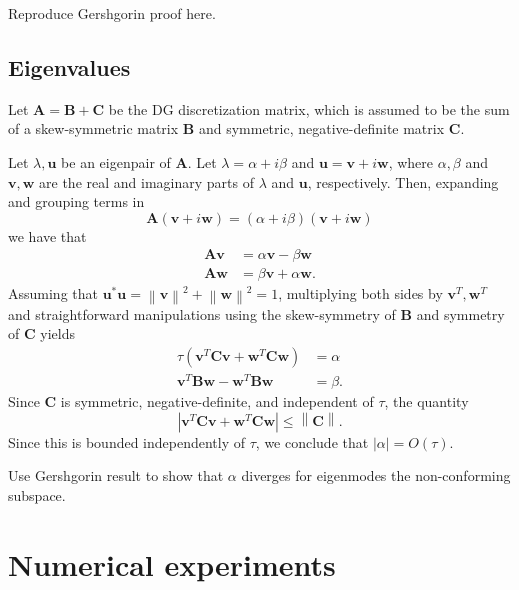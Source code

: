 \documentclass[10pt]{article}
\newcommand{\nor}[1]{\left\| #1 \right\|}
\newcommand{\LRp}[1]{\left( #1 \right)}
\newcommand{\LRb}[1]{\left| #1 \right|}
\newcommand{\note}[1]{{\color{blue}#1}}
\begin{document}
\note{Reproduce Gershgorin proof here.}


\subsection{Eigenvalues}

Let $\bm{A} = \bm{B} + \bm{C}$ be the DG discretization matrix, which is assumed to be the sum of a skew-symmetric matrix $\bm{B}$ and symmetric, negative-definite matrix $\bm{C}$.  

Let $\lambda, \bm{u}$ be an eigenpair of $\bm{A}$. Let $\lambda = \alpha + i\beta$ and $\bm{u} = \bm{v} + i\bm{w}$, where $\alpha,\beta$ and $\bm{v},\bm{w}$ are the real and imaginary parts of $\lambda$ and $\bm{u}$, respectively.  Then, expanding and grouping terms in
\[
\bm{A}(\bm{v} + i\bm{w}) = (\alpha + i\beta) (\bm{v} + i\bm{w})
\]
we have that
\begin{align*}
\bm{A}\bm{v} &= \alpha\bm{v}-\beta\bm{w}\\
\bm{A}\bm{w} &= \beta\bm{v}+\alpha\bm{w}.
\end{align*}
Assuming that $\bm{u}^*\bm{u} = \nor{\bm{v}}^2 + \nor{\bm{w}}^2 = 1$, multiplying both sides by $\bm{v}^T,\bm{w}^T$ and straightforward manipulations %
using the skew-symmetry of $\bm{B}$ and symmetry of $\bm{C}$ yields
\begin{align*}
\tau\LRp{\bm{v}^T\bm{C}\bm{v} + \bm{w}^T\bm{C}\bm{w}} &= \alpha\\
\bm{v}^T\bm{B}\bm{w} - \bm{w}^T\bm{B}\bm{w} &= \beta.
\end{align*}
Since $\bm{C}$ is symmetric, negative-definite, and independent of $\tau$, the quantity
\[
\LRb{\bm{v}^T\bm{C}\bm{v} + \bm{w}^T\bm{C}\bm{w}} \leq \nor{\bm{C}}.
\]
Since this is bounded independently of $\tau$, we conclude that $\LRb{\alpha} = O(\tau)$.  

\note{Use Gershgorin result to show that $\alpha$ diverges for eigenmodes the non-conforming subspace.}

\section{Numerical experiments}







\end{document}
